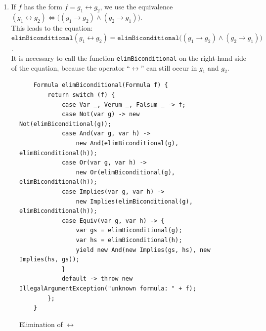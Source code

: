 \begin{enumerate}
\begin{enumerate}
      \end{enumerate}
\item If $f$ has the form $f = g_1 \leftrightarrow g_2$, we use the
      equivalence \\[0.2cm]
      \hspace*{1.3cm} 
      $(g_1 \leftrightarrow g_2) \Leftrightarrow \bigl( (g_1 \rightarrow g_2) \wedge (g_2 \rightarrow g_1)\bigr) $.
      \\[0.2cm]
      This leads to the equation:
      \\[0.2cm]
      \hspace*{1.3cm} 
      $\texttt{elimBiconditional}(g_1 \leftrightarrow g_2) = \texttt{elimBiconditional}\bigl( (g_1 \rightarrow g_2) \wedge (g_2 \rightarrow g_1)\bigr)$. 
      \\[0.2cm]
      It is necessary to call the function \texttt{elimBiconditional} on the right-hand side of the equation,
      because the operator ``$\leftrightarrow$'' can still occur in $g_1$ and $g_2$.
\end{enumerate}


\begin{figure}[!ht]
  \centering
\begin{verbatim}
    Formula elimBiconditional(Formula f) {
        return switch (f) {
            case Var _, Verum _, Falsum _ -> f;
            case Not(var g) -> new Not(elimBiconditional(g));
            case And(var g, var h) ->
                new And(elimBiconditional(g), elimBiconditional(h));
            case Or(var g, var h) ->
                new Or(elimBiconditional(g), elimBiconditional(h));
            case Implies(var g, var h) ->
                new Implies(elimBiconditional(g), elimBiconditional(h));
            case Equiv(var g, var h) -> {
                var gs = elimBiconditional(g);
                var hs = elimBiconditional(h);
                yield new And(new Implies(gs, hs), new Implies(hs, gs));
            }
            default -> throw new IllegalArgumentException("unknown formula: " + f);
        };
    }
\end{verbatim}
\vspace*{-0.3cm}
  \caption{Elimination of $\leftrightarrow$}
  \label{fig:elimBiconditional}
\end{figure} 


